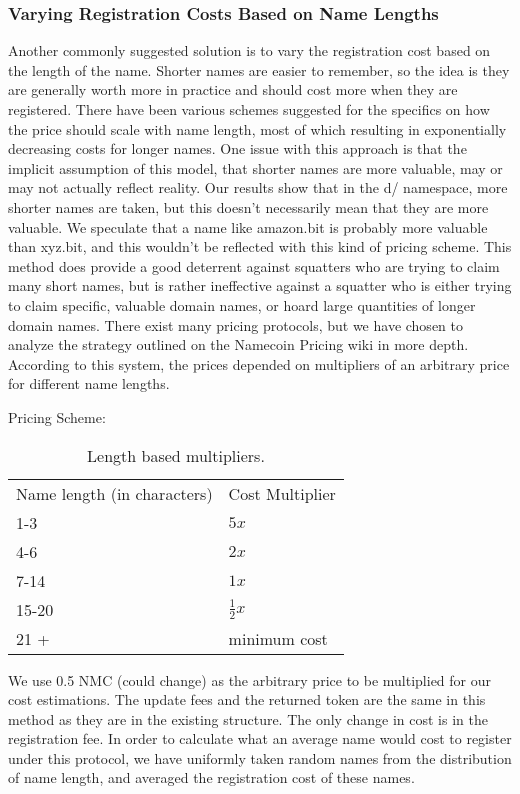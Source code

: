 \subsubsection{Varying Registration Costs Based on Name Lengths}
    Another commonly suggested solution is to vary the registration cost based on the length of the name. Shorter names are easier to remember, so the idea is they are generally worth more in practice and should cost more when they are registered. There have been various schemes suggested for the specifics on how the price should scale with name length, most of which resulting in exponentially decreasing costs for longer names. One issue with this approach is that the implicit assumption of this model, that shorter names are more valuable, may or may not actually reflect reality. Our results show that in the d/ namespace, more shorter names are taken, but this doesn't necessarily mean that they are more valuable. We speculate that a name like amazon.bit is probably more valuable than xyz.bit, and this wouldn't be reflected with this kind of pricing scheme.  This method does provide a good deterrent against squatters who are trying to claim many short names, but is rather ineffective against a squatter who is either trying to claim specific, valuable domain names, or hoard large quantities of longer domain names. 
    There exist many pricing protocols, but we have chosen to analyze the strategy outlined on the Namecoin Pricing wiki in more depth. According to this system, the prices depended on multipliers of an arbitrary price for different name lengths. 

Pricing Scheme:


\begin{table}[t]
  \centering
  \begin{tabular}{| l | l |} \hline
    Name length (in characters) & Cost Multiplier \\
    1-3 & \( 5 x \) \\
    4-6 & \( 2 x \) \\
    7-14 & \( 1 x \) \\
    15-20 & \( \frac{1}{2} x \) \\
    21 + & minimum cost \\ \hline
  \end{tabular}
  \caption{Length based multipliers.}
\end{table}




    We use 0.5 NMC (could change) as the arbitrary price to be multiplied for our cost estimations. The update fees and the returned token are the same in this method as they are in the existing structure. The only change in cost is in the registration fee. In order to calculate what an average name would cost to register under this protocol, we have uniformly taken random names from the distribution of name length, and averaged the registration cost of these names. 




